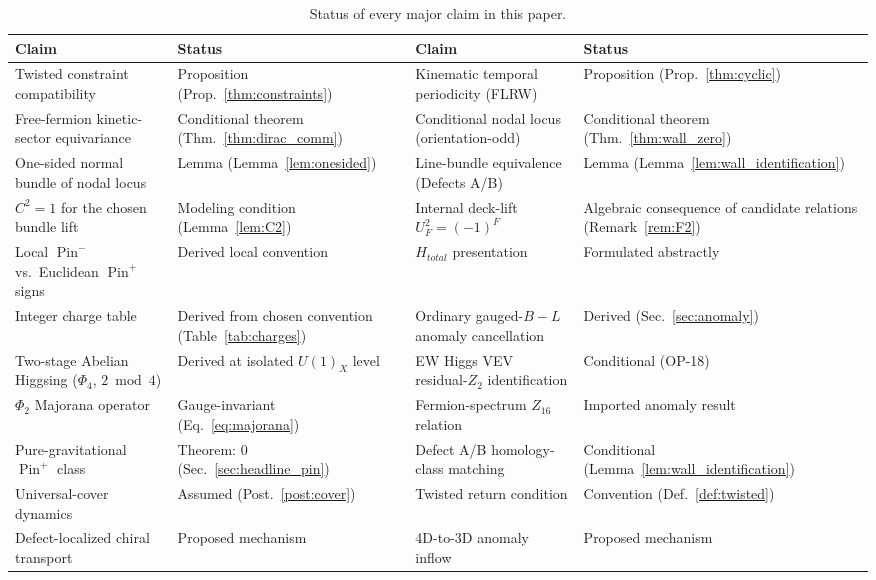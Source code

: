 \documentclass[11pt]{article}
\theoremstyle{canonmath}
\theoremstyle{canonpostulate}
\theoremstyle{canonclaim}
\providecommand{\Pin}{\operatorname{Pin}}
\def\mathrm#1{#1}%
\def\mathbb#1{#1}%
\begin{document}
\newpage
\begin{table}[H]
\centering
\caption{Status of every major claim in this paper.}
\scriptsize
\setlength{\tabcolsep}{3.5pt}
\renewcommand{\arraystretch}{0.92}

\begin{tabular}{@{}p{}p{}p{}p{}@{}}
\toprule
\textbf{Claim} & \textbf{Status} & \textbf{Claim} & \textbf{Status} \\
\midrule
Twisted constraint compatibility & Proposition (Prop.~\ref{thm:constraints}) & Kinematic temporal periodicity (FLRW) & Proposition (Prop.~\ref{thm:cyclic}) \\
Free-fermion kinetic-sector equivariance & Conditional theorem (Thm.~\ref{thm:dirac_comm}) & Conditional nodal locus (orientation-odd) & Conditional theorem (Thm.~\ref{thm:wall_zero}) \\
One-sided normal bundle of nodal locus & Lemma (Lemma~\ref{lem:onesided}) & Line-bundle equivalence (Defects A/B) & Lemma (Lemma~\ref{lem:wall_identification}) \\
$C^2=1$ for the chosen bundle lift & Modeling condition (Lemma~\ref{lem:C2}) & Internal deck-lift $U_F^2=(-1)^F$ & Algebraic consequence of candidate relations (Remark~\ref{rem:F2}) \\
Local $\Pin^-$ vs.\ Euclidean $\Pin^+$ signs & Derived local convention & $H_{\mathrm{total}}$ presentation & Formulated abstractly \\
Integer charge table & Derived from chosen convention (Table~\ref{tab:charges}) & Ordinary gauged-$B-L$ anomaly cancellation & Derived (Sec.~\ref{sec:anomaly}) \\
Two-stage Abelian Higgsing ($\Phi_4$, $2\bmod4$) & Derived at isolated $U(1)_X$ level & EW Higgs VEV residual-$\mathbb Z_2$ identification & Conditional (OP-18) \\
$\Phi_2$ Majorana operator & Gauge-invariant (Eq.~\ref{eq:majorana}) & Fermion-spectrum $\mathbb Z_{16}$ relation & Imported anomaly result \\
Pure-gravitational $\Pin^+$ class & Theorem: $0$ (Sec.~\ref{sec:headline_pin}) & Defect A/B homology-class matching & Conditional (Lemma~\ref{lem:wall_identification}) \\
Universal-cover dynamics & Assumed (Post.~\ref{post:cover}) & Twisted return condition & Convention (Def.~\ref{def:twisted}) \\
Defect-localized chiral transport & Proposed mechanism & 4D-to-3D anomaly inflow & Proposed mechanism \\

\end{tabular}
\end{table}
\end{document}
